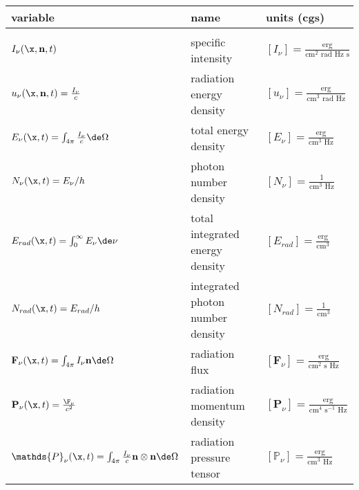 \begin{center}
\begin{small}
\begin{tabular}{p{} p{} p{}}


variable  & name & units (cgs) \\[.5em]
\hline \\

$I_\nu (\x, \mathbf{n}, t)$ &
        specific intensity &
        $[I_\nu] = \frac{\text{erg}}{\text{cm}^2 \text{ rad Hz s}}$
\\[.5em]
$u_\nu (\x, \mathbf{n}, t) = \frac{I_\nu}{c}$ &
        radiation energy density &
        $[u_\nu] = \frac{\text{erg}}{\text{cm}^3 \text{ rad Hz}}$
\\[.5em]
$E_\nu (\x, t) = \int_{4 \pi} \frac{I_\nu}{c} \de \Omega$ &
        total energy density &
        $[E_\nu] = \frac{\text{erg}}{\text{cm}^3 \text{ Hz}}$
\\[.5em]
$N_\nu (\x, t) = E_\nu / h$ &
        photon number density &
        $[N_\nu] = \frac{1}{\text{cm}^3 \text{ Hz}}$
\\[.5em]
$E_{rad} (\x, t) = \int_{0}^{\infty} E_\nu \de \nu$ &
        total integrated energy density &
        $[E_{rad}] = \frac{\text{erg}}{\text{cm}^3}$
\\[.5em]
$N_{rad} (\x, t) = E_{rad} / h$ &
        integrated photon number density &
        $[N_{rad}] = \frac{1}{\text{cm}^3}$
\\[.5em]
$\mathbf{F}_\nu(\x, t) = \int_{4 \pi}  I_\nu \mathbf{n} \de \Omega$ &
        radiation flux &
        $[\mathbf{F}_\nu] = \frac{\text{erg}}{\text{cm}^2 \text{ s Hz}}$
\\[.5em]
$\mathbf{P}_\nu (\x, t) = \frac{\F_\nu}{c^2}$ &
        radiation momentum density &
        $[\mathbf{P}_\nu] = \frac{\text{erg}}{ \text{cm}^4 \text{ s}^{-1} \text{ Hz}}$
\\[.5em]
$\mathds{P}_\nu (\x, t) = \int_{4 \pi} \frac{I_\nu}{c} \mathbf{n} \otimes \mathbf{n} \de \Omega$ &
        radiation pressure tensor &
        $[\mathds{P}_\nu ] = \frac{\text{erg}}{\text{cm}^3 \text{ Hz}}$



\end{tabular}
\end{small}
\end{center}
